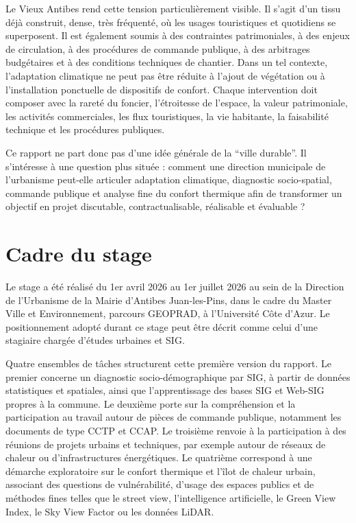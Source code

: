 \documentclass[11pt,a4paper]{report}
\begin{document}
Le Vieux Antibes rend cette tension particulièrement visible. Il s'agit d'un tissu déjà construit, dense, très fréquenté, où les usages touristiques et quotidiens se superposent. Il est également soumis à des contraintes patrimoniales, à des enjeux de circulation, à des procédures de commande publique, à des arbitrages budgétaires et à des conditions techniques de chantier. Dans un tel contexte, l'adaptation climatique ne peut pas être réduite à l'ajout de végétation ou à l'installation ponctuelle de dispositifs de confort. Chaque intervention doit composer avec la rareté du foncier, l'étroitesse de l'espace, la valeur patrimoniale, les activités commerciales, les flux touristiques, la vie habitante, la faisabilité technique et les procédures publiques.

Ce rapport ne part donc pas d'une idée générale de la \enquote{ville durable}. Il s'intéresse à une question plus située : comment une direction municipale de l'urbanisme peut-elle articuler adaptation climatique, diagnostic socio-spatial, commande publique et analyse fine du confort thermique afin de transformer un objectif en projet discutable, contractualisable, réalisable et évaluable ?

\section*{Cadre du stage}

Le stage a été réalisé du 1er avril 2026 au 1er juillet 2026 au sein de la Direction de l'Urbanisme de la Mairie d'Antibes Juan-les-Pins, dans le cadre du Master Ville et Environnement, parcours GEOPRAD, à l'Université Côte d'Azur. Le positionnement adopté durant ce stage peut être décrit comme celui d'une stagiaire chargée d'études urbaines et SIG.

Quatre ensembles de tâches structurent cette première version du rapport. Le premier concerne un diagnostic socio-démographique par SIG, à partir de données statistiques et spatiales, ainsi que l'apprentissage des bases SIG et Web-SIG propres à la commune. Le deuxième porte sur la compréhension et la participation au travail autour de pièces de commande publique, notamment les documents de type CCTP et CCAP. Le troisième renvoie à la participation à des réunions de projets urbains et techniques, par exemple autour de réseaux de chaleur ou d'infrastructures énergétiques. Le quatrième correspond à une démarche exploratoire sur le confort thermique et l'îlot de chaleur urbain, associant des questions de vulnérabilité, d'usage des espaces publics et de méthodes fines telles que le street view, l'intelligence artificielle, le Green View Index, le Sky View Factor ou les données LiDAR.
\end{document}
